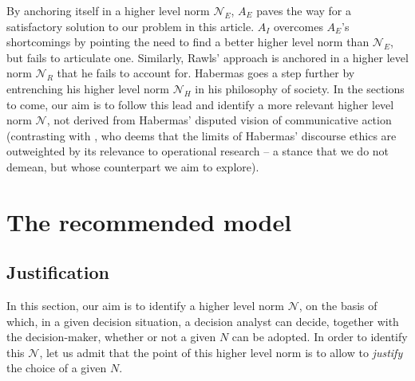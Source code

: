 \documentclass[preprint, french, english, 11pt, authoryear]{elsarticle}%
\newcommand{\adv}{\mathscr{N}}
\begin{document}
By anchoring itself in a higher level norm $\mathscr{N}_E$, $A_E$ paves the way for a satisfactory solution to our problem in this article. $A_I$ overcomes $A_E$'s shortcomings by pointing the need to find a better higher level norm than $\mathscr{N}_E$, but fails to articulate one. Similarly, Rawls' approach is anchored in a higher level norm $\mathscr{N}_{R}$ that he fails to account for. Habermas goes a step further by entrenching his higher level norm $\mathscr{N}_{H}$ in his philosophy of society. In the sections to come, our aim is to follow this lead and identify a more relevant higher level norm $\adv$, not derived from Habermas' disputed vision of communicative action (contrasting with \cite{mingers_ethics_2011}, who deems that the limits of Habermas' discourse ethics are outweighted by its relevance to operational research -- a stance that we do not demean, but whose counterpart we aim to explore).

\section{The recommended model}
\subsection{Justification}
In this section, our aim is to identify a higher level norm $\adv$, on the basis of which, in a given decision situation, a decision analyst can decide, together with the decision-maker, whether or not a given $N$ can be adopted. In order to identify this $\adv$, let us admit that the point of this higher level norm is to allow to \emph{justify} the choice of a given $N$.
\end{document}
